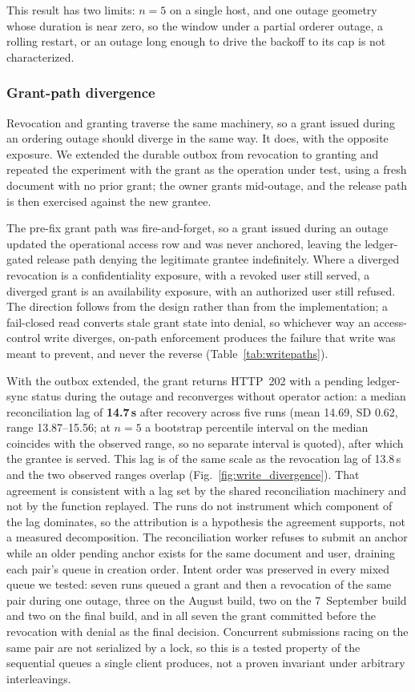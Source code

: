 \documentclass[preprint,12pt]{elsarticle}
\begin{document}
This result has two limits: $n=5$ on a single host, and one outage geometry
whose duration is near zero, so the window under a partial orderer outage, a
rolling restart, or an outage long enough to drive the backoff to its cap is not
characterized.

\subsubsection{Grant-path divergence}
\label{sec:exp_grantdivergence}

Revocation and granting traverse the same machinery, so a grant issued during
an ordering outage should diverge in the same way. It does, with the opposite
exposure. We extended the durable outbox from revocation to granting and repeated the
experiment with the grant as the operation under test, using a fresh document
with no prior grant; the owner grants mid-outage, and the release path is then
exercised against the new grantee.

The pre-fix grant path was fire-and-forget, so a grant issued during an
outage updated the operational access row and was never anchored, leaving the
ledger-gated release path denying the legitimate grantee indefinitely. Where a
diverged revocation is a confidentiality exposure, with a revoked user still
served, a diverged grant is an availability exposure, with an authorized user
still refused. The direction follows from the design rather than from the
implementation; a fail-closed read converts stale grant state into denial, so
whichever way an access-control write diverges, on-path enforcement produces
the failure that write was meant to prevent, and never the reverse
(Table~\ref{tab:writepaths}).

With the outbox extended, the grant returns HTTP~202 with a pending
ledger-sync status during the outage and reconverges without operator action:
a median reconciliation lag of \textbf{14.7\,s} after recovery across five
runs (mean 14.69, SD 0.62, range 13.87--15.56; at $n=5$ a bootstrap
percentile interval on the median coincides with the observed range, so no
separate interval is quoted), after which the grantee is served. This lag
is of the same scale as the revocation lag of 13.8\,s and the two
observed ranges overlap (Fig.~\ref{fig:write_divergence}). That agreement is
consistent with a lag set by the shared reconciliation machinery and not by
the function replayed. The runs do not instrument which component of the lag
dominates, so the attribution is a hypothesis the agreement supports, not a
measured decomposition. The reconciliation worker refuses to submit an anchor while an
older pending anchor exists for the same document and user, draining each
pair's queue in creation order. Intent order was preserved in every mixed
queue we tested: seven runs queued a grant and then a revocation of the same
pair during one outage, three on the August build, two on the 7~September
build and two on the final build, and in all seven the grant committed before
the revocation with denial as the final decision. Concurrent submissions racing on the same pair
are not serialized by a lock, so this is a tested property of the sequential
queues a single client produces, not a proven invariant under arbitrary
interleavings.
\end{document}
